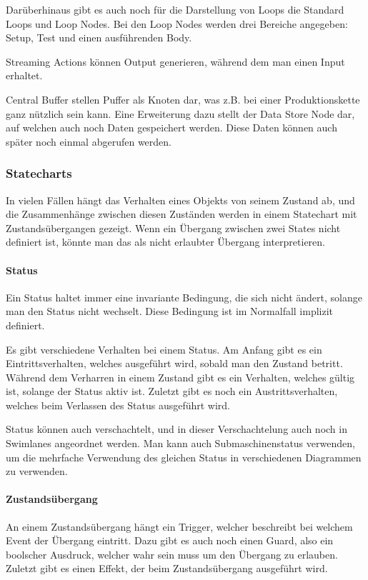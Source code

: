 Darüberhinaus gibt es auch noch für die Darstellung von Loops die Standard Loops und Loop Nodes. Bei den Loop Nodes werden drei Bereiche angegeben: Setup, Test und einen ausführenden Body.

Streaming Actions können Output generieren, während dem man einen Input erhaltet.

Central Buffer stellen Puffer als Knoten dar, was z.B. bei einer Produktionskette ganz nützlich sein kann. Eine Erweiterung dazu stellt der Data Store Node dar, auf welchen auch noch Daten gespeichert werden. Diese Daten können auch später noch einmal abgerufen werden.

\subsubsection{Statecharts}
In vielen Fällen hängt das Verhalten eines Objekts von seinem Zustand ab, und die Zusammenhänge zwischen diesen Zuständen werden in einem Statechart mit Zustandsübergangen gezeigt. Wenn ein Übergang zwischen zwei States nicht definiert ist, könnte man das als nicht erlaubter Übergang interpretieren.

\paragraph{Status}
Ein Status haltet immer eine invariante Bedingung, die sich nicht ändert, solange man den Status nicht wechselt. Diese Bedingung ist im Normalfall implizit definiert.

Es gibt verschiedene Verhalten bei einem Status. Am Anfang gibt es ein Eintrittsverhalten, welches ausgeführt wird, sobald man den Zustand betritt. Während dem Verharren in einem Zustand gibt es ein Verhalten, welches gültig ist, solange der Status aktiv ist. Zuletzt gibt es noch ein Austrittsverhalten, welches beim Verlassen des Status ausgeführt wird.

Status können auch verschachtelt, und in dieser Verschachtelung auch noch in Swimlanes angeordnet werden. Man kann auch Submaschinenstatus verwenden, um die mehrfache Verwendung des gleichen Status in verschiedenen Diagrammen zu verwenden.

\paragraph{Zustandsübergang}
An einem Zustandsübergang hängt ein Trigger, welcher beschreibt bei welchem Event der Übergang eintritt. Dazu gibt es auch noch einen Guard, also ein boolscher Ausdruck, welcher wahr sein muss um den Übergang zu erlauben. Zuletzt gibt es einen Effekt, der beim Zustandsübergang ausgeführt wird.


